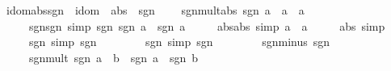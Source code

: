 \begin{isabellebody}
\isanewline
{}\isamarkupfalse%
\isanewline
\isanewline
{}\isamarkupfalse%
\ idom{\isacharunderscore}{\kern0pt}abs{\isacharunderscore}{\kern0pt}sgn\ {\isacharequal}{\kern0pt}\ idom\ {\isacharplus}{\kern0pt}\ abs\ {\isacharplus}{\kern0pt}\ sgn\ {\isacharplus}{\kern0pt}\isanewline
\ \ \ sgn{\isacharunderscore}{\kern0pt}mult{\isacharunderscore}{\kern0pt}abs{\isacharcolon}{\kern0pt}\ {\isachardoublequoteopen}sgn\ a\ {\isacharasterisk}{\kern0pt}\ {\isasymbar}a{\isasymbar}\ {\isacharequal}{\kern0pt}\ a{\isachardoublequoteclose}\isanewline
\ \ \ \ \ sgn{\isacharunderscore}{\kern0pt}sgn\ {\isacharbrackleft}{\kern0pt}simp{\isacharbrackright}{\kern0pt}{\isacharcolon}{\kern0pt}\ {\isachardoublequoteopen}sgn\ {\isacharparenleft}{\kern0pt}sgn\ a{\isacharparenright}{\kern0pt}\ {\isacharequal}{\kern0pt}\ sgn\ a{\isachardoublequoteclose}\isanewline
\ \ \ \ \ abs{\isacharunderscore}{\kern0pt}abs\ {\isacharbrackleft}{\kern0pt}simp{\isacharbrackright}{\kern0pt}{\isacharcolon}{\kern0pt}\ {\isachardoublequoteopen}{\isasymbar}{\isasymbar}a{\isasymbar}{\isasymbar}\ {\isacharequal}{\kern0pt}\ {\isasymbar}a{\isasymbar}{\isachardoublequoteclose}\isanewline
\ \ \ \ \ abs{\isacharunderscore}{\kern0pt}{}\ {\isacharbrackleft}{\kern0pt}simp{\isacharbrackright}{\kern0pt}{\isacharcolon}{\kern0pt}\ {\isachardoublequoteopen}{\isasymbar}{}{\isasymbar}\ {\isacharequal}{\kern0pt}\ {}{\isachardoublequoteclose}\isanewline
\ \ \ \ \ sgn{\isacharunderscore}{\kern0pt}{}\ {\isacharbrackleft}{\kern0pt}simp{\isacharbrackright}{\kern0pt}{\isacharcolon}{\kern0pt}\ {\isachardoublequoteopen}sgn\ {}\ {\isacharequal}{\kern0pt}\ {}{\isachardoublequoteclose}\isanewline
\ \ \ \ \ sgn{\isacharunderscore}{\kern0pt}{}\ {\isacharbrackleft}{\kern0pt}simp{\isacharbrackright}{\kern0pt}{\isacharcolon}{\kern0pt}\ {\isachardoublequoteopen}sgn\ {}\ {\isacharequal}{\kern0pt}\ {}{\isachardoublequoteclose}\isanewline
\ \ \ \ \ sgn{\isacharunderscore}{\kern0pt}minus{\isacharunderscore}{\kern0pt}{}{\isacharcolon}{\kern0pt}\ {\isachardoublequoteopen}sgn\ {\isacharparenleft}{\kern0pt}{\isacharminus}{\kern0pt}\ {}{\isacharparenright}{\kern0pt}\ {\isacharequal}{\kern0pt}\ {\isacharminus}{\kern0pt}\ {}{\isachardoublequoteclose}\isanewline
\ \ \ \ \ sgn{\isacharunderscore}{\kern0pt}mult{\isacharcolon}{\kern0pt}\ {\isachardoublequoteopen}sgn\ {\isacharparenleft}{\kern0pt}a\ {\isacharasterisk}{\kern0pt}\ b{\isacharparenright}{\kern0pt}\ {\isacharequal}{\kern0pt}\ sgn\ a\ {\isacharasterisk}{\kern0pt}\ sgn\ b{\isachardoublequoteclose}\isanewline

\end{isabellebody}
